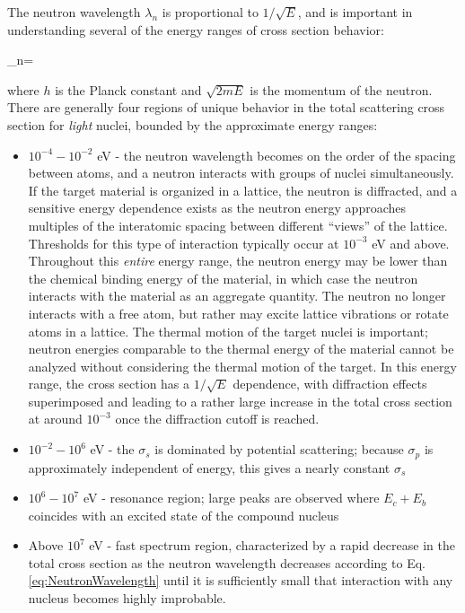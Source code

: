 The neutron wavelength \(\lambda_n\) is proportional to \(1/\sqrt{E}\), and is important in understanding several of the energy ranges of cross section behavior:

\beq
\label{eq:NeutronWavelength}
\lambda_n=
\eeq

where \(h\) is the Planck constant and \(\sqrt{2mE}\) is the momentum of the neutron. There are generally four regions of unique behavior in the total scattering cross section for {\it light} nuclei, bounded by the approximate energy ranges:

\begin{itemize}
\item \(10^{-4}-10^{-2}\) eV - the neutron wavelength becomes on the order of the spacing between atoms, and a neutron interacts with groups of nuclei simultaneously. If the target material is organized in a lattice, the neutron is diffracted, and a sensitive energy dependence exists as the neutron energy approaches multiples of the interatomic spacing between different ``views'' of the lattice. Thresholds for this type of interaction typically occur at \(10^{-3}\) eV and above. Throughout this {\it entire} energy range, the neutron energy may be lower than the chemical binding energy of the material, in which case the neutron interacts with the material as an aggregate quantity. The neutron no longer interacts with a free atom, but rather may excite lattice vibrations or rotate atoms in a lattice. The thermal motion of the target nuclei is important; neutron energies comparable to the thermal energy of the material cannot be analyzed without considering the thermal motion of the target. In this energy range, the cross section has a \(1/\sqrt{E}\) dependence, with diffraction effects superimposed and leading to a rather large increase in the total cross section at around \(10^{-3}\) once the diffraction cutoff is reached.
\item \(10^{-2}-10^6\) eV - the \(\sigma_s\) is dominated by potential scattering; because \(\sigma_p\) is approximately independent of energy, this gives a nearly constant \(\sigma_s\) 
\item \(10^6-10^7\) eV - resonance region; large peaks are observed where \(E_c+E_b\) coincides with an excited state of the compound nucleus
\item Above \(10^7\) eV - fast spectrum region, characterized by a rapid decrease in the total cross section as the neutron wavelength decreases according to Eq. \eqref{eq:NeutronWavelength} until it is sufficiently small that interaction with any nucleus becomes highly improbable.
\end{itemize}


